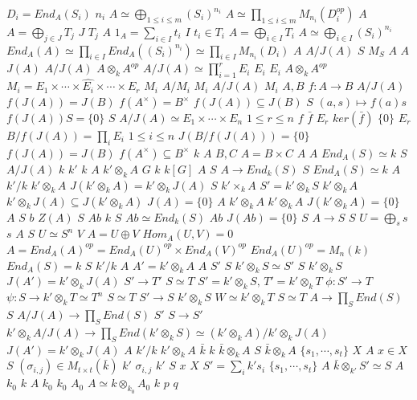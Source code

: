 \documentclass{article}
\begin{document}
$D_i=End_A(S_i)$
$n_i$
$A \simeq \bigoplus_{1 \leq i \leq m} (S_i)^{n_i}$
$A \simeq \prod_{1 \leq i \leq m}M_{n_i}(D_i^{op})$
$A$
$A=\bigoplus_{j \in J}T_j$
$J$
$T_j$
$A$
$1_A=\sum_{i \in I}t_i$
$I$
$t_i \in T_i$
$A=\bigoplus_{i \in I}T_i$
$A \simeq \bigoplus_{i \in I}(S_i)^{n_i}$
$End_A(A) \simeq \prod_{i \in I}End_A((S_i)^{n_i}) \simeq \prod_{i \in I}M_{n_i}(D_i)$
$A$
$A/J(A)$
$S$
$M_S$
$A$
$A$
$J(A)$
$A/J(A)$
$A \otimes_k A^{op}$
$A/J(A) \simeq \prod_{i=1}^rE_i$
$E_i$
$E_i$
$A \otimes_k A^{op}$
$M_i=E_1 \times \cdots \times \widehat{E_i}\times\cdots\times E_r$
$M_i$
$A/M_i$
$M_i$
$A/J(A)$
$M_i$
$A,B$
$f:A \rightarrow B$
$A/J(A)$
$f(J(A))=J(B)$
$f(A^\times)=B^\times$
$f(J(A)) \subseteq J(B)$
$S$
$(a,s) \mapsto f(a)s$
$f(J(A))S=\{0\}$
$S$
$A/J(A) \simeq E_1 \times \cdots \times E_n$
$1 \leq r \leq n$
$f$
$\bar{f}$
$E_r$
$ker(\bar{f})$
$\{0\}$
$E_r$
$B/f(J(A))=\prod_i E_i$
$1 \leq i \leq n$
$J(B/f(J(A)))=\{0\}$
$f(J(A))=J(B)$
$f(A^\times) \subseteq B^\times$
$k$
$A$
$B,C$
$A=B\times C$
$A$
$A$
$End_A(S) \simeq k$
$S$
$A/J(A)$
$k$
$k'$
$k$
$A$
$k' \otimes_k A$
$G$
$k$
$k[G]$
$A$
$S$
$A \rightarrow End_k(S)$
$S$
$End_A(S) \simeq k$
$A$
$k'/k$
$k' \otimes_kA$
$J(k' \otimes_k A)=k'\otimes_kJ(A)$
$S$
$k'\times_kA$
$S'=k'\otimes_kS$
$k'\otimes_kA$
$k' \otimes_k J(A) \subseteq J(k' \otimes_k A)$
$J(A)=\{0\}$
$A$
$k' \otimes_k A$
$k' \otimes_k A$
$J(k' \otimes_k A)=\{0\}$
$A$
$S$
$b$
$Z(A)$
$S$
$Ab$
$k$
$S$
$Ab \simeq End_k(S)$
$Ab$
$J(Ab)=\{0\}$
$S$
$A \rightarrow S$
$S$
$U=\bigoplus_ss$
$s$
$A$
$S$
$U \simeq S^n$
$V$
$A=U \oplus V$
$Hom_A(U,V)=0$
$A=End_A(A)^{op}=End_A(U)^{op} \times End_A(V)^{op}$
$End_A(U)^{op}=M_n(k)$
$End_A(S)=k$
$S$
$k'/k$
$A$
$A'=k' \otimes_k A$
$A$
$S'$
$S$
$k' \otimes_k S \simeq S'$
$S$
$k' \otimes_k S$
$J(A')=k' \otimes_k J(A)$
$S' \rightarrow T'$
$S \simeq T$
$S'=k' \otimes_kS,\,T'= k' \otimes_kT$
$\phi:S' \rightarrow T$
$\psi:S \rightarrow k'\otimes_kT \simeq T^n$
$S \simeq T$
$S' \rightarrow S$
$k' \otimes_k S$
$W \simeq k' \otimes_k T$
$S \simeq T$
$A \rightarrow \prod_S End(S)$
$S$
$A/J(A) \rightarrow \prod_S End(S)$
$S'$
$S \rightarrow S'$
$k' \otimes_k A/J(A) \rightarrow \prod_SEnd(k' \otimes_k S) \simeq (k' \otimes_k A)/k' \otimes_k J(A)$
$J(A')=k' \otimes_k J(A)$
$A$
$k'/k$
$k' \otimes_k A$
$\bar{k}$
$k$
$\bar{k} \otimes_k A$
$S$
$\bar{k} \otimes_k A$
$\{s_1,\cdots,s_t\}$
$X$
$A$
$x \in X$
$S$
$(\sigma_{i,j}) \in M_{t \times t}(\bar{k})$
$k'$
$\sigma_{i,j}$
$k'$
$S$
$x$
$X$
$S'=\sum_ik's_i$
$\{s_1, \cdots,s_t\}$
$A$
$\bar{k} \otimes_{k'} S' \simeq S$
$A$
$k_0$
$k$
$A$
$k_0$
$k_0$
$A_0$
$A \simeq k \otimes_{k_0}A_0$
$k$
$p$
$q$
\end{document}
